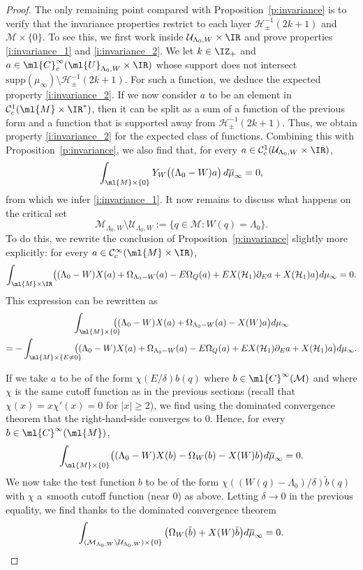 \documentclass[JEP,XML,SOM,Unicode, NoEqCountersInSection,published]{cedram}
\theoremstyle{plain}
\theoremstyle{definition}
\theoremstyle{remark}
\begin{document}
\begin{proof}
The only remaining point compared with Proposition~\ref{p:invariance} is to verify that the invariance properties restrict to each layer $\mathcal{H}_\pm^{-1}(2k+1) $ and $\mathcal{M}\times\{0\}.$ To see this, we first work inside $\mathcal{U}_{\Lambda_0,W}\times\IR$ and prove properties \eqref{i:invariance_1} and \eqref{i:invariance_2}. We let $k\in\IZ_+$ and $a\in\ml{C}^{\infty}_{c}(\ml{U}_{\Lambda_0,W}\times\IR)$ whose support does not intersect $\text{supp}(\mu_\infty)\setminus\mathcal{H}_\pm^{-1}(2k+1)$. For such a function, we deduce the expected property \eqref{i:invariance_2}. If we now consider $a$ to be an element in $\mathcal{C}^1_c(\ml{M}\times\IR^*)$, then it can be split as a sum of a function of the previous form and a function that is supported away from $\mathcal{H}_\pm^{-1}(2k+1)$. Thus, we obtain property \eqref{i:invariance_2} for the expected class of functions. Combining this with Proposition~\ref{p:invariance}, we also find that, for every $a\in\mathcal{C}^1_c(\mathcal{U}_{\Lambda_0,W}\times\IR)$,
\[
\int_{\ml{M}\times\{0\}} Y_W \big((\Lambda_0-W)a \big) \, d\overline{ \mu}_\infty = 0,
\]
from which we infer \eqref{i:invariance_1}. It now remains to discuss what happens on the critical set
\[
\mathcal{M}_{\Lambda_0,W}\setminus\mathcal{U}_{\Lambda_0,W}:=\{q\in\mathcal{M}: W(q)=\Lambda_0\}.
\]
To do this, we rewrite the conclusion of Proposition~\ref{p:invariance} slightly more explicitly: for every $a\in\mathcal{C}^{\infty}_c(\ml{M}\times\IR)$,
\[
\int_{\ml{M}\times\IR}\bigl((\Lambda_0-W)X(a)+\Omega_{\Lambda_0-W}(a)-E\Omega_Q(a)+EX(\mathcal{H}_1)\partial_Ea+X(\mathcal{H}_1)a\bigr)d\mu_{\infty}=0.
\]
This expression can be rewritten as
\begin{multline*}
\int_{\ml{M}\times\{0\}}\hspace*{-3mm}\bigl((\Lambda_0-W)X(a)+\Omega_{\Lambda_0-W}(a)-X(W)a\bigr)d\mu_{\infty}\\
=-\int_{\ml{M}\times\{E\neq 0\}}\hspace*{-3mm}\bigl((\Lambda_0-W)X(a)+\Omega_{\Lambda_0-W}(a)-E\Omega_Q(a)+EX(\mathcal{H}_1)\partial_Ea+X(\mathcal{H}_1)a\bigr)d\mu_{\infty}.
\end{multline*}

If we take $a$ to be of the form $\chi(E/\delta)b(q)$ where $b\in\ml{C}^{\infty}(\mathcal{M})$ and where $\chi$ is the same cutoff function as in the previous sections (recall that $\chi(x)=x\chi'(x)=0$ for $|x|\geq 2$), we find using the dominated convergence theorem that the right-hand-side converges to $0$. Hence, for every $b\in\ml{C}^{\infty}(\ml{M})$,
\[
\int_{\ml{M}\times\{0\}}\bigl((\Lambda_0-W)X(b)-\Omega_{W}(b)-X(W)b\bigr)d\overline{\mu}_{\infty}=0.
\]
We now take the test function $b$ to be of the form $\chi((W(q)-\Lambda_0)/\delta)\tilde{b}(q)$ with $\chi$ a~smooth cutoff function (near $0$) as above. Letting $\delta\to 0$ in the previous equality, we find thanks to the dominated convergence theorem
\[
\int_{(\mathcal{M}_{\Lambda_0,W}\setminus\mathcal{U}_{\Lambda_0,W})\times\{0\}}\big(\Omega_{W}(\tilde{b})+X(W)\tilde{b}\big)d\overline{\mu}_{\infty}=0.\qedhere
\]
\end{proof}
\end{document}

